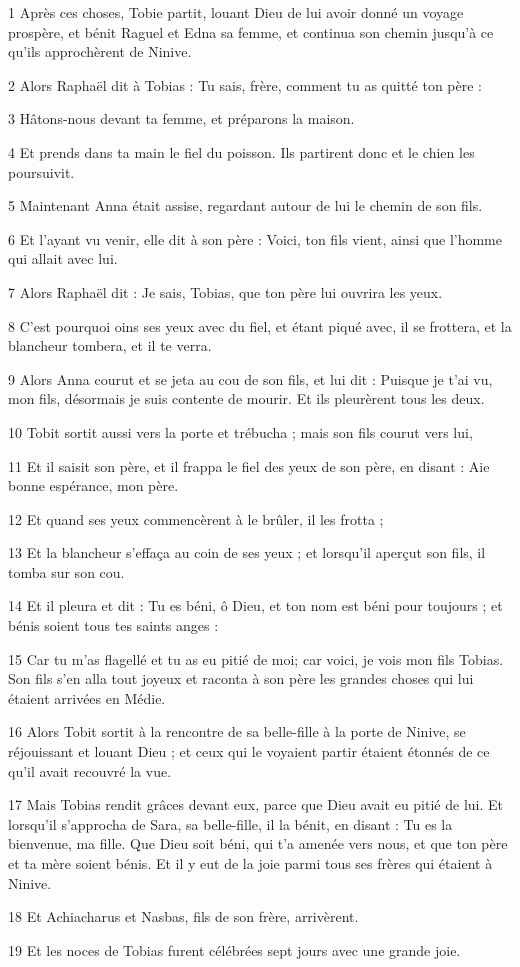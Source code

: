 \par 1 Après ces choses, Tobie partit, louant Dieu de lui avoir donné un voyage prospère, et bénit Raguel et Edna sa femme, et continua son chemin jusqu'à ce qu'ils approchèrent de Ninive.
\par 2 Alors Raphaël dit à Tobias : Tu sais, frère, comment tu as quitté ton père :
\par 3 Hâtons-nous devant ta femme, et préparons la maison.
\par 4 Et prends dans ta main le fiel du poisson. Ils partirent donc et le chien les poursuivit.
\par 5 Maintenant Anna était assise, regardant autour de lui le chemin de son fils.
\par 6 Et l'ayant vu venir, elle dit à son père : Voici, ton fils vient, ainsi que l'homme qui allait avec lui.
\par 7 Alors Raphaël dit : Je sais, Tobias, que ton père lui ouvrira les yeux.
\par 8 C'est pourquoi oins ses yeux avec du fiel, et étant piqué avec, il se frottera, et la blancheur tombera, et il te verra.
\par 9 Alors Anna courut et se jeta au cou de son fils, et lui dit : Puisque je t'ai vu, mon fils, désormais je suis contente de mourir. Et ils pleurèrent tous les deux.
\par 10 Tobit sortit aussi vers la porte et trébucha ; mais son fils courut vers lui,
\par 11 Et il saisit son père, et il frappa le fiel des yeux de son père, en disant : Aie bonne espérance, mon père.
\par 12 Et quand ses yeux commencèrent à le brûler, il les frotta ;
\par 13 Et la blancheur s'effaça au coin de ses yeux ; et lorsqu'il aperçut son fils, il tomba sur son cou.
\par 14 Et il pleura et dit : Tu es béni, ô Dieu, et ton nom est béni pour toujours ; et bénis soient tous tes saints anges :
\par 15 Car tu m'as flagellé et tu as eu pitié de moi; car voici, je vois mon fils Tobias. Son fils s'en alla tout joyeux et raconta à son père les grandes choses qui lui étaient arrivées en Médie.
\par 16 Alors Tobit sortit à la rencontre de sa belle-fille à la porte de Ninive, se réjouissant et louant Dieu ; et ceux qui le voyaient partir étaient étonnés de ce qu'il avait recouvré la vue.
\par 17 Mais Tobias rendit grâces devant eux, parce que Dieu avait eu pitié de lui. Et lorsqu'il s'approcha de Sara, sa belle-fille, il la bénit, en disant : Tu es la bienvenue, ma fille. Que Dieu soit béni, qui t'a amenée vers nous, et que ton père et ta mère soient bénis. Et il y eut de la joie parmi tous ses frères qui étaient à Ninive.
\par 18 Et Achiacharus et Nasbas, fils de son frère, arrivèrent.
\par 19 Et les noces de Tobias furent célébrées sept jours avec une grande joie.

